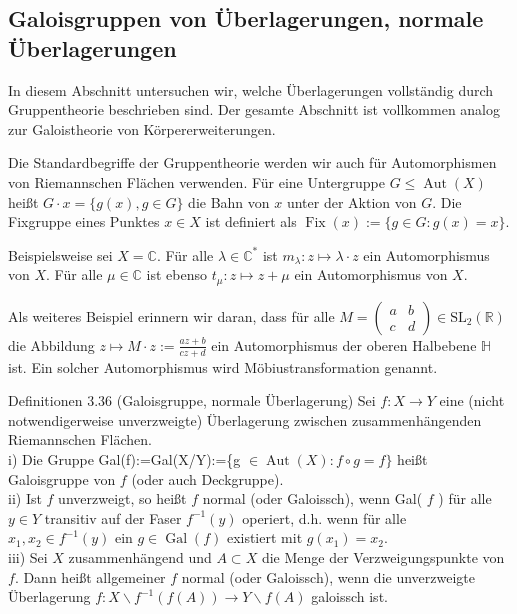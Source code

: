 \documentclass[10pt, letterpaper]{article}
\begin{document}
\pagebreak

\subsection {Galoisgruppen von Überlagerungen, normale Überlagerungen}
In diesem Abschnitt untersuchen wir, welche Überlagerungen vollständig durch Gruppentheorie beschrieben sind. Der gesamte Abschnitt ist vollkommen analog zur Galoistheorie von Körpererweiterungen.

Die Standardbegriffe der Gruppentheorie werden wir auch für Automorphismen von Riemannschen Flächen verwenden. Für eine Untergruppe $G \leq \operatorname{Aut}(X)$ heißt $G \cdot x=\{g(x), g \in G\}$ die Bahn von $x$ unter der Aktion von $G$. Die Fixgruppe eines Punktes $x \in X$ ist definiert als $\operatorname{Fix}(x):=\{g \in G: g(x)=x\}$.

Beispielsweise sei $X=\mathbb{C}$. Für alle $\lambda \in \mathbb{C}^{*}$ ist $m_{\lambda}: z \longmapsto \lambda \cdot z$ ein Automorphismus von $X$. Für alle $\mu \in \mathbb{C}$ ist ebenso $t_{\mu}: z \longmapsto z+\mu$ ein Automorphismus von $X$.

Als weiteres Beispiel erinnern wir daran, dass für alle $M=\left(\begin{array}{ll}a & b \\ c & d\end{array}\right) \in \mathrm{SL}_{2}(\mathbb{R})$ die Abbildung $z \longmapsto M \cdot z:=\frac{a z+b}{c z+d}$ ein Automorphismus der oberen Halbebene $\mathbb{H}$ ist. Ein solcher Automorphismus wird Möbiustransformation genannt.

Definitionen 3.36 (Galoisgruppe, normale Überlagerung) Sei $f: X \longrightarrow Y$ eine (nicht notwendigerweise unverzweigte) Überlagerung zwischen zusammenhängenden Riemannschen Flächen.\\
i) Die Gruppe Gal(f):=Gal(X/Y):=\{g $\in \operatorname{Aut}(X): f \circ g=f\}$ heißt Galoisgruppe von $f$ (oder auch Deckgruppe).\\
ii) Ist $f$ unverzweigt, so heißt $f$ normal (oder Galoissch), wenn Gal( $f$ ) für alle $y \in Y$ transitiv auf der Faser $f^{-1}(y)$ operiert, d.h. wenn für alle $x_{1}, x_{2} \in f^{-1}(y)$ ein $g \in \operatorname{Gal}(f)$ existiert mit $g\left(x_{1}\right)=x_{2}$.\\
iii) Sei $X$ zusammenhängend und $A \subset X$ die Menge der Verzweigungspunkte von $f$. Dann heißt allgemeiner $f$ normal (oder Galoissch), wenn die unverzweigte Überlagerung $f: X \backslash f^{-1}(f(A)) \rightarrow Y \backslash f(A)$ galoissch ist.
\end{document}
